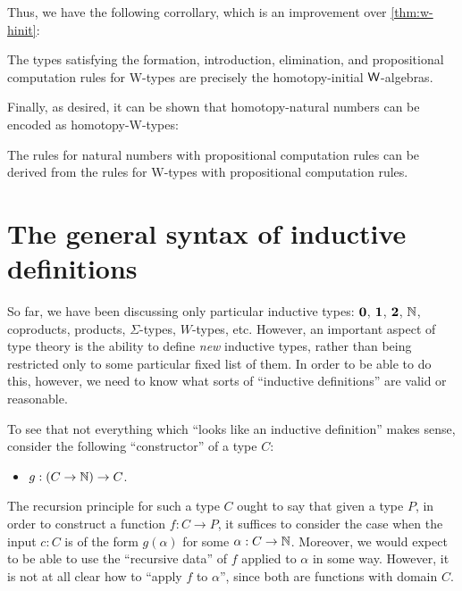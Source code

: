 Thus, we have the following corrollary, which is an improvement over \autoref{thm:w-hinit}:

\begin{cor}
The types satisfying the formation, introduction, elimination, and propositional computation rules for W-types are precisely the homotopy-initial $\mathsf{W}$-algebras.
\end{cor}

Finally, as desired, it can be shown that homotopy-natural numbers can be encoded as homotopy-W-types:

\begin{thm}
The rules for natural numbers with propositional computation rules can be derived from the rules for W-types with propositional computation rules.
\end{thm}


\section{The general syntax of inductive definitions}
\label{sec:strictly-positive}

So far, we have been discussing only particular inductive types: $\mathbf{0}$, $\mathbf{1}$, $\mathbf{2}$, $\mathbb{N}$, coproducts, products, $\Sigma$-types, $W$-types, etc.
However, an important aspect of type theory is the ability to define \emph{new} inductive types, rather than being restricted only to some particular fixed list of them.
In order to be able to do this, however, we need to know what sorts of ``inductive definitions'' are valid or reasonable.

To see that not everything which ``looks like an inductive definition'' makes sense, consider the following ``constructor'' of a type $C$:
\begin{itemize}
\item $g:(C\to \mathbb{N}) \to C$.
\end{itemize}
The recursion principle for such a type $C$ ought to say that given a type $P$, in order to construct a function $f:C\to P$, it suffices to consider the case when the input $c:C$ is of the form $g(\alpha)$ for some $\alpha:C\to\mathbb{N}$.
Moreover, we would expect to be able to use the ``recursive data'' of $f$ applied to $\alpha$ in some way.
However, it is not at all clear how to ``apply $f$ to $\alpha$'', since both are functions with domain $C$.

